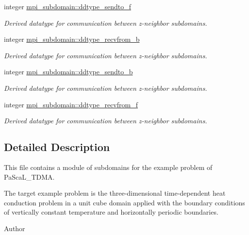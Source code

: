 \textbf{ }\par
\begin{DoxyCompactItemize}
\item 
integer \mbox{\hyperlink{namespacempi__subdomain_a4f3d66535b947c7afee75e6e73a47206}{mpi\+\_\+subdomain\+::ddtype\+\_\+sendto\+\_\+f}}
\begin{DoxyCompactList}\small\item\em Derived datatype for communication between z-\/neighbor subdomains. \end{DoxyCompactList}\item 
integer \mbox{\hyperlink{namespacempi__subdomain_ad6462f18c8c68c076005957e9d062252}{mpi\+\_\+subdomain\+::ddtype\+\_\+recvfrom\+\_\+b}}
\begin{DoxyCompactList}\small\item\em Derived datatype for communication between z-\/neighbor subdomains. \end{DoxyCompactList}\item 
integer \mbox{\hyperlink{namespacempi__subdomain_a7a2af0322a7aaa435951a5432859687a}{mpi\+\_\+subdomain\+::ddtype\+\_\+sendto\+\_\+b}}
\begin{DoxyCompactList}\small\item\em Derived datatype for communication between z-\/neighbor subdomains. \end{DoxyCompactList}\item 
integer \mbox{\hyperlink{namespacempi__subdomain_a4da19838e8bc3934ad5c24db424bec2c}{mpi\+\_\+subdomain\+::ddtype\+\_\+recvfrom\+\_\+f}}
\begin{DoxyCompactList}\small\item\em Derived datatype for communication between z-\/neighbor subdomains. \end{DoxyCompactList}\end{DoxyCompactItemize}



\subsection{Detailed Description}
This file contains a module of subdomains for the example problem of Pa\+Sca\+L\+\_\+\+T\+D\+MA. 

The target example problem is the three-\/dimensional time-\/dependent heat conduction problem in a unit cube domain applied with the boundary conditions of vertically constant temperature and horizontally periodic boundaries. \begin{DoxyAuthor}{Author}

\end{DoxyAuthor}

